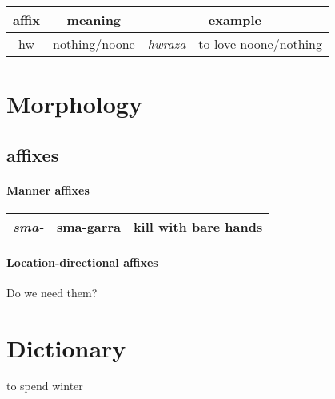 \documentclass[8pt]{book}
\begin{document}
\begin{center}
\begin{tabular}{c | c | c}
affix & meaning & example \\ \hline
hw & nothing/noone & \textit{hwraza} - to love noone/nothing \\
\end{tabular}
\end{center}


\section{Morphology}
\subsection{affixes}
\paragraph{Manner affixes}
\begin{center}
\begin{tabular}{| c | c | c |}
  \hline
  \textit{sma-} & sma-garra & kill with bare hands \\ \hline
\end{tabular}
\end{center}

\paragraph{Location-directional affixes} Do we need them?

\section{Dictionary}
\begin{multicols}{2}
  \begin{description}
  \item [inha]
  	\begin{enumerate*}
  		 {to spend winter}
  	\end{enumerate*}
  
  \end{description}
\end{multicols}
\end{document}
